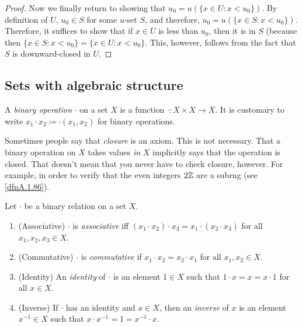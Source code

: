 \begin{thm}
\begin{proof}
Now we finally return to showing that $u_0=u\left( \{ x\in U:x<u_0\} \right)$.  By definition of $U$, $u_0\in S$ for some $u$-set $S$, and therefore, $u_0=u\left( \{ x\in S:x<u_0\} \right)$.  Therefore, it suffices to show that if $x\in U$ is less than $u_0$, then it is in $S$ (because then $\{ x\in S:x<u_0\} =\{ x\in U:x<u_0\}$.  This, however, follows from the fact that $S$ is downward-closed in $U$.
\end{proof}
\end{thm}

\subsection{Sets with algebraic structure}

\begin{dfn}
A \emph{binary operation} $\cdot$ on a set $X$ is a function $\cdot :X\times X\rightarrow X$.  It is customary to write $x_1\cdot x_2\coloneqq \cdot (x_1,x_2)$ for binary operations.
\begin{rmk}
Sometimes people say that \emph{closure} is an axiom.  This is not necessary.  That a binary operation on $X$ takes values \emph{in} $X$ implicitly says that the operation is closed.  That doesn't mean that you never have to check closure, however.  For example, in order to verify that the even integers $2\mathbb{Z}$ are a subrng (see \cref{dfnA.1.86}).
\end{rmk}
\end{dfn}
\begin{dfn}
Let $\cdot$ be a binary relation on a set $X$.
\begin{enumerate}
\item (Associative) $\cdot$ is \emph{associative} iff $(x_1\cdot x_2)\cdot x_3=x_1\cdot (x_2\cdot x_3)$ for all $x_1,x_2,x_3\in X$.
\item (Commutative) $\cdot$ is \emph{commutative} if $x_1\cdot x_2=x_2\cdot x_1$ for all $x_1,x_2\in X$.
\item (Identity) An \emph{identity} of $\cdot$ is an element $1\in X$ such that $1\cdot x=x=x\cdot 1$ for all $x\in X$.
\item (Inverse) If $\cdot$ has an identity and $x\in X$, then an \emph{inverse} of $x$ is an element $x^{-1}\in X$ such that $x\cdot x^{-1}=1=x^{-1}\cdot x$.
\end{enumerate}
\end{dfn}

